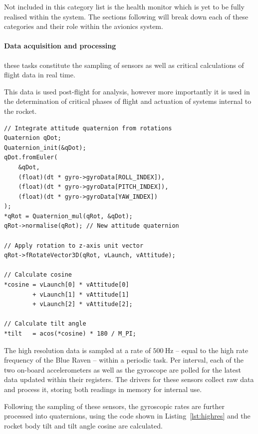 Not included in this category list is the health monitor which is yet to be fully realised within the system. The sections following will break down each of these categories and their role within the avionics system.

\paragraph{Data acquisition and processing} these tasks constitute the sampling of sensors as well as critical calculations of flight data in real time. 

This data is used post-flight for analysis, however more importantly it is used in the determination of critical phases of flight and actuation of systems internal to the rocket.\\

\begin{lstlisting}[escapeinside=``, caption={High resolution quaternion calculations}, captionpos=b, label={lst:highres}]
// Integrate attitude quaternion from rotations
Quaternion qDot;
Quaternion_init(&qDot);
qDot.fromEuler(
    &qDot,
    (float)(dt * gyro->gyroData[ROLL_INDEX]),
    (float)(dt * gyro->gyroData[PITCH_INDEX]),
    (float)(dt * gyro->gyroData[YAW_INDEX])
);
*qRot = Quaternion_mul(qRot, &qDot);
qRot->normalise(qRot); // New attitude quaternion

// Apply rotation to z-axis unit vector
qRot->fRotateVector3D(qRot, vLaunch, vAttitude);

// Calculate cosine
*cosine = vLaunch[0] * vAttitude[0] 
        + vLaunch[1] * vAttitude[1] 
        + vLaunch[2] * vAttitude[2];

// Calculate tilt angle
*tilt   = acos(*cosine) * 180 / M_PI;
\end{lstlisting}

The high resolution data is sampled at a rate of $\qty{500}{\hertz}$ -- equal to the high rate frequency of the Blue Raven -- within a periodic task. Per interval, each of the two on-board accelerometers as well as the gyroscope are polled for the latest data updated within their registers. The drivers for these sensors collect raw data and process it, storing both readings in memory for internal use.

Following the sampling of these sensors, the gyroscopic rates are further processed into quaternions, using the code shown in Listing~\ref{lst:highres} and the rocket body tilt and tilt angle cosine are calculated. 

